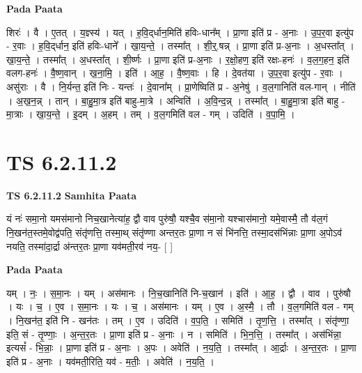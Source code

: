 \documentclass[17pt]{extarticle}
\begin{document}
\textbf{Pada Paata} \newline

शिरः॑ । वै । ए॒तत् । य॒ज्ञ्स्य॑ । यत् । ह॒वि॒द्‌र्धान॒मिति॑ हविः-धान᳚म् । प्रा॒णा इति॑ प्र - अ॒नाः । उ॒प॒र॒वा इत्यु॑प - र॒वाः । ह॒वि॒द्‌र्धान॒ इति॑ हविः-धाने᳚ । खा॒य॒न्ते॒ । तस्मा᳚त् । शी॒र्॒.षन्न् । प्रा॒णा इति॑ प्र-अ॒नाः । अ॒धस्ता᳚त् । खा॒य॒न्ते॒ । तस्मा᳚त् । अ॒धस्ता᳚त् । शी॒र्ष्णः । प्रा॒णा इति॑ प्र-अ॒नाः । र॒क्षो॒हण॒ इति॑ रक्षः-हनः॑ । व॒ल॒ग॒हन॒ इति॑ वलग-हनः॑ । वै॒ष्ण॒वान् । ख॒ना॒मि॒ । इति॑ । आ॒ह॒ । वै॒ष्ण॒वाः । हि । दे॒वत॑या । उ॒प॒र॒वा इत्यु॑प - र॒वाः । असु॑राः । वै । नि॒र्यन्त॒ इति॑ निः - यन्तः॑ । दे॒वाना᳚म् । प्रा॒णेष्विति॑ प्र - अ॒नेषु॑ । व॒ल॒गानिति॑ वल-गान् । नीति॑ । अ॒ख॒न॒न्न् । तान् । बा॒हु॒मा॒त्र इति॑ बाहु-मा॒त्रे । अन्विति॑ । अ॒वि॒न्द॒न्न् । तस्मा᳚त् । बा॒हु॒मा॒त्रा इति॑ बाहु - मा॒त्राः । खा॒य॒न्ते॒ । इ॒दम् । अ॒हम् । तम् । व॒ल॒गमिति॑ वल - गम् । उदिति॑ । व॒पा॒मि॒ ।  \newline





\section{ TS 6.2.11.2 }

\textbf{TS 6.2.11.2 } \newline
\textbf{Samhita Paata} \newline

यं नः॑ समा॒नो यमस॑मानो निच॒खानेत्या॑ह॒ द्वौ वाव पुरु॑षौ॒ यश्चै॒व स॑मा॒नो यश्चास॑मानो॒ यमे॒वास्मै॒ तौ व॑ल॒गं नि॒खन॑त॒स्तमे॒वोद्व॑पति॒ संतृ॑णत्ति॒ तस्मा॒थ् संतृ॑ण्णा अन्तर॒तः प्रा॒णा न सं भि॑नत्ति॒ तस्मा॒दस॑भिंन्नाः प्रा॒णा अ॒पोऽव॑ नयति॒ तस्मा॑दा॒र्द्रा अ॑न्तर॒तः प्रा॒णा यव॑मती॒रव॑ नय॒- [  ] \newline

\textbf{Pada Paata} \newline

यम् । नः॒ । स॒मा॒नः । यम् । अस॑मानः । नि॒च॒खानिति॑ नि-च॒खान॑ । इति॑ । आ॒ह॒ । द्वौ । वाव । पुरु॑षौ । यः । च॒ । ए॒व । स॒मा॒नः । यः । च॒ । अस॑मानः । यम् । ए॒व । अ॒स्मै॒ । तौ । व॒ल॒गमिति॑ वल - गम् । नि॒खन॑त॒ इति॑ नि - खन॑तः । तम् । ए॒व । उदिति॑ । व॒प॒ति॒ । समिति॑ । तृ॒ण॒त्ति॒ । तस्मा᳚त् । संतृ॑ण्णा॒ इति॒ सं - तृ॒ण्णाः॒ । अ॒न्त॒र॒तः । प्रा॒णा इति॑ प्र - अ॒नाः । न । समिति॑ । भि॒न॒त्ति॒ । तस्मा᳚त् । अस॑भिंन्ना॒ इत्यसं᳚ - भि॒न्नाः॒ । प्रा॒णा इति॑ प्र - अ॒नाः । अ॒पः । अवेति॑ । न॒य॒ति॒ । तस्मा᳚त् । आ॒र्द्राः । अ॒न्त॒र॒तः । प्रा॒णा इति॑ प्र - अ॒नाः । यव॑मती॒रिति॒ यव॑ - म॒तीः॒ । अवेति॑ । न॒य॒ति॒ ।  \newline
\end{document}
